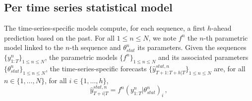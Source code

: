 \documentclass{article} %
\newcommand{\ts}{y}
\newcommand{\fullts}{{\bf \ts}}
\newcommand{\tspred}{\hat{\ts}}
\newcommand{\stat}{f}
\newcommand{\statparam}{\theta_{stat}}
\newcommand{\lag}{h}
\begin{document}

\subsection{Per time series statistical model}
The time-series-specific models compute, for each sequence, a first $\lag$-ahead prediction based on the past. For all $1\leqslant n \leqslant N$, we note $\stat^n$ the $n$-th parametric model linked to the $n$-th sequence and $\statparam^n$ its parameters. Given the sequences $\{\ts^n_{1:T}\}_{1\leqslant n \leqslant N}$, the parametric models $\{\stat^n\}_{1\leqslant n \leqslant N}$ and its associated parameters $\{\statparam^n\}_{1\leqslant n \leqslant N}$, the time-series-specific forecasts $\{\tspred^{stat,n}_{T+1:T+\lag|T}\}_{1\leqslant n \leqslant N}$ are, for all $n \in \{1,\ldots,N\}$, for all $i \in \{1,\ldots,\lag\}$,
$$
\tspred^{stat,n}_{T+i|T} = \stat^n(\ts^n_{1:T}|\statparam^n)_i\,,
$$
\end{document}
